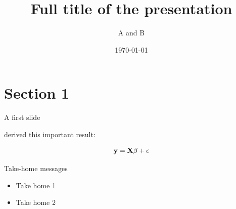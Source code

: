 \documentclass{beamer}
\title[Footer Caption \hspace{3mm} Short title \hspace{9em} \insertframenumber\ of \inserttotalframenumber]{Full title of the presentation}
\author[Author A, Author B]{A and B}
\date{\today}
\institute[The University of Iowa]{The University of Iowa, College of (Fill in)}
\begin{document}
\frame{\titlepage}

\section{Section 1}

\begin{frame}{A first slide}

  \citet{paper01} derived this important result:

  $$\mathbf{y} = \mathbf{X}\beta + \epsilon$$

\end{frame}

\begin{frame}{Take-home messages}
  \begin{itemize}    
  \item Take home 1
  \item Take home 2 
  \end{itemize}
  
\end{frame}



\end{document}

